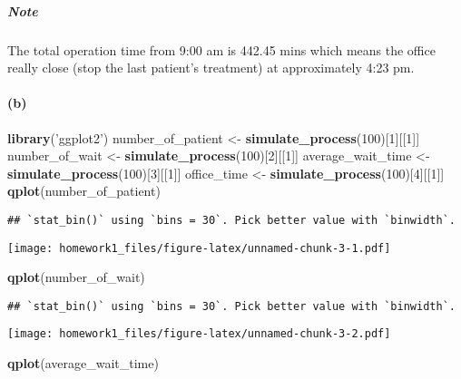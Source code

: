 \documentclass[]{article}
\newenvironment{Shaded}{\begin{snugshade}}{\end{snugshade}}
\newcommand{\KeywordTok}[1]{\textcolor[rgb]{0.13,0.29,0.53}{\textbf{#1}}}
\newcommand{\DecValTok}[1]{\textcolor[rgb]{0.00,0.00,0.81}{#1}}
\newcommand{\StringTok}[1]{\textcolor[rgb]{0.31,0.60,0.02}{#1}}
\newcommand{\NormalTok}[1]{#1}
\let\oldparagraph\paragraph
\renewcommand{\paragraph}[1]{\oldparagraph{#1}\mbox{}}
\let\oldsubparagraph\subparagraph
\renewcommand{\subparagraph}[1]{\oldsubparagraph{#1}\mbox{}}
\begin{document}
\subparagraph{Note}\label{note}

The total operation time from 9:00 am is 442.45 mins which means the
office really close (stop the last patient's treatment) at approximately
4:23 pm.

\paragraph{(b)}\label{b}

\begin{Shaded}
\begin{Highlighting}[]
\KeywordTok{library}\NormalTok{(}\StringTok{'ggplot2'}\NormalTok{)}
\NormalTok{number_of_patient <-}\StringTok{ }\KeywordTok{simulate_process}\NormalTok{(}\DecValTok{100}\NormalTok{)[}\DecValTok{1}\NormalTok{][[}\DecValTok{1}\NormalTok{]]}
\NormalTok{number_of_wait <-}\StringTok{ }\KeywordTok{simulate_process}\NormalTok{(}\DecValTok{100}\NormalTok{)[}\DecValTok{2}\NormalTok{][[}\DecValTok{1}\NormalTok{]]}
\NormalTok{average_wait_time <-}\StringTok{ }\KeywordTok{simulate_process}\NormalTok{(}\DecValTok{100}\NormalTok{)[}\DecValTok{3}\NormalTok{][[}\DecValTok{1}\NormalTok{]]}
\NormalTok{office_time <-}\StringTok{ }\KeywordTok{simulate_process}\NormalTok{(}\DecValTok{100}\NormalTok{)[}\DecValTok{4}\NormalTok{][[}\DecValTok{1}\NormalTok{]]}
\KeywordTok{qplot}\NormalTok{(number_of_patient)}
\end{Highlighting}
\end{Shaded}

\begin{verbatim}
## `stat_bin()` using `bins = 30`. Pick better value with `binwidth`.
\end{verbatim}

\texttt{[image: homework1\_files/figure-latex/unnamed-chunk-3-1.pdf]}

\begin{Shaded}
\begin{Highlighting}[]
\KeywordTok{qplot}\NormalTok{(number_of_wait)}
\end{Highlighting}
\end{Shaded}

\begin{verbatim}
## `stat_bin()` using `bins = 30`. Pick better value with `binwidth`.
\end{verbatim}

\texttt{[image: homework1\_files/figure-latex/unnamed-chunk-3-2.pdf]}

\begin{Shaded}
\begin{Highlighting}[]
\KeywordTok{qplot}\NormalTok{(average_wait_time)}
\end{Highlighting}
\end{Shaded}
\end{document}
